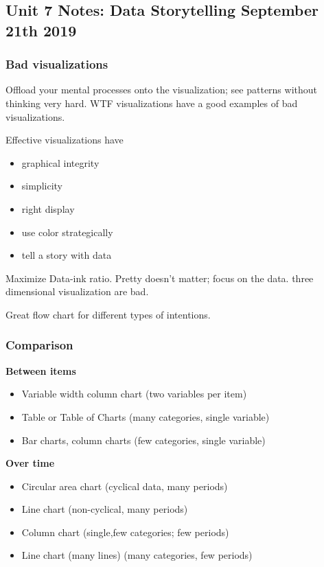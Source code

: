 \subsection{Unit 7 Notes: Data Storytelling September 21th 2019}

\subsubsection{Bad visualizations}
Offload your mental processes onto the visualization;
see patterns without thinking very hard. WTF visualizations
have a good examples of bad visualizations.

Effective visualizations have
\begin{itemize}
\item graphical integrity
\item simplicity
\item right display
\item use color strategically
\item tell a story with data
\end{itemize}

Maximize Data-ink ratio. Pretty
doesn't matter; focus on the data.
three dimensional visualization are bad.

Great flow chart for different types
of intentions.

\subsubsection{Comparison}
\textbf{Between items} \\
\begin{itemize}
\item Variable width column chart (two variables per item)
\item Table or Table of Charts (many categories, single variable)
\item Bar charts, column charts (few categories, single variable)
\end{itemize}

\textbf{Over time} \\
\begin{itemize}
\item Circular area chart (cyclical data, many periods)
\item Line chart (non-cyclical, many periods)
\item Column chart (single,few categories; few periods)
\item Line chart (many lines) (many categories, few periods)
\end{itemize}

